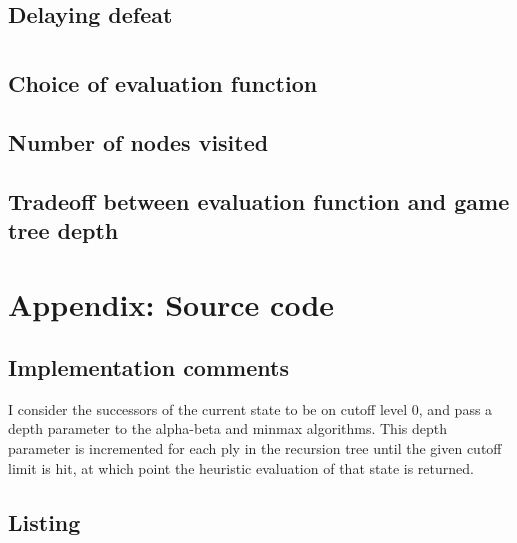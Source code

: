 \documentclass[letterpaper, 12pt]{article}
\numberwithin{theorem}{section}
\begin{document}
\subsection{Delaying defeat}

\section{}
\subsection{Choice of evaluation function}

\subsection{Number of nodes visited}

\subsection{Tradeoff between evaluation function and game tree depth}



\clearpage
\appendix
\section{Appendix: Source code}
\subsection{Implementation comments}
I consider the successors of the current state to be on cutoff level 0, and pass a depth parameter to the alpha-beta and minmax algorithms. This depth parameter is incremented for each ply in the recursion tree until the given cutoff limit is hit, at which point the heuristic evaluation of that state is returned.

\subsection{Listing}

\end{document}

